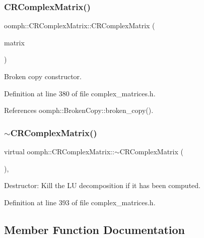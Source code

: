 \subsubsection{\texorpdfstring{C\+R\+Complex\+Matrix()}{CRComplexMatrix()}\hspace{0.1cm}{\footnotesize\ttfamily [3/3]}}
{\footnotesize\ttfamily oomph\+::\+C\+R\+Complex\+Matrix\+::\+C\+R\+Complex\+Matrix (\begin{DoxyParamCaption}\item[{const \hyperlink{classoomph_1_1CRComplexMatrix}{C\+R\+Complex\+Matrix} \&}]{matrix }\end{DoxyParamCaption})\hspace{0.3cm}{\ttfamily [inline]}}



Broken copy constructor. 



Definition at line 380 of file complex\+\_\+matrices.\+h.



References oomph\+::\+Broken\+Copy\+::broken\+\_\+copy().

\mbox{\label{classoomph_1_1CRComplexMatrix_a355bb8b8f6ff1e504bb8e449d6fbfb0a}} 
\subsubsection{\texorpdfstring{$\sim$\+C\+R\+Complex\+Matrix()}{~CRComplexMatrix()}}
{\footnotesize\ttfamily virtual oomph\+::\+C\+R\+Complex\+Matrix\+::$\sim$\+C\+R\+Complex\+Matrix (\begin{DoxyParamCaption}{ }\end{DoxyParamCaption})\hspace{0.3cm}{\ttfamily [inline]}, {\ttfamily [virtual]}}



Destructor\+: Kill the LU decomposition if it has been computed. 



Definition at line 393 of file complex\+\_\+matrices.\+h.



\subsection{Member Function Documentation}
\mbox{\label{classoomph_1_1CRComplexMatrix_af541bd4937b4029764d1af2343633691}} 
